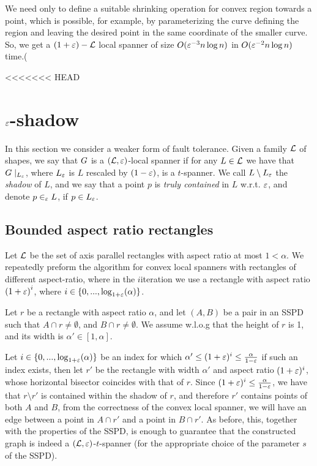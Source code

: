 \documentclass[12pt]{article}%
\begin{document}
We need only to define a suitable shrinking operation for convex
region towards a point, which is possible, for example, by
parameterizing the curve defining the region and leaving the desired
point in the same coordinate of the smaller curve. So, we get a
$(1+\varepsilon)-\mathcal{L}$ local spanner of size $O(\varepsilon^{-3}n\log n)$ in
$O(\varepsilon^{-2}n\log n)$ time.(


<<<<<<< HEAD

\section{$\varepsilon$-shadow}

In this section we consider a weaker form of fault tolerance. Given a
family $\mathcal{L}$ of shapes, we say that $G$ is a $(\mathcal{L},\varepsilon)$-local
spanner if for any $L\in\mathcal{L}$ we have that $G\mid_{L_{\varepsilon}}$, where
$L_{\varepsilon}$ is $L$ rescaled by $(1-\varepsilon)$, is a $t$-spanner. We call
$L\setminus L_{\varepsilon}$ the \emph{shadow} of $L$, and we say that a
point $p$ is \emph{truly contained} in $L$ w.r.t. $\varepsilon$, and denote
$p\in_{\varepsilon} L$, if $p\in L_{\varepsilon}$.

\subsection{Bounded aspect ratio rectangles}
Let $\mathcal{L}$ be the set of axis parallel rectangles with aspect ratio at
most $1<\alpha$. We repeatedly preform the algorithm for convex local
spanners with rectangles of different aspect-ratio, where in the
$i$\th iteration we use a rectangle with aspect ratio
$\left(1+\varepsilon\right)^i$, where $i\in\{0,...,\log_{1+\varepsilon}(\alpha)\}$.

Let $r$ be a rectangle with aspect ratio $\alpha$, and let $(A,B)$ be
a pair in an SSPD such that $A\cap r\neq \emptyset$, and
$B\cap r\neq \emptyset$. We assume w.l.o.g that the height of $r$ is
1, and its width is $\alpha'\in [1,\alpha]$.

Let $i\in \{0,...,\log_{1+\varepsilon}(\alpha)\}$ be an index for which
$\alpha' \leq (1+\varepsilon)^i \leq \frac{\alpha}{1-\varepsilon}$ if such an index
exists, then let $r'$ be the rectangle with width $\alpha'$ and aspect
ratio $(1+\varepsilon)^i$, whose horizontal bisector coincides with that of
$r$. Since $(1+\varepsilon)^i \leq \frac{\alpha}{1-\varepsilon}$, we have that
$r\setminus r'$ is contained within the shadow of $r$, and therefore
$r'$ contains points of both $A$ and $B$, from the correctness of the
convex local spanner, we will have an edge between a point in
$A\cap r'$ and a point in $B\cap r'$. As before, this, together with
the properties of the SSPD, is enough to guarantee that the
constructed graph is indeed a $(\mathcal{L}, \varepsilon)$-$t$-spanner (for the
appropriate choice of the parameter $s$ of the SSPD).
\end{document}
